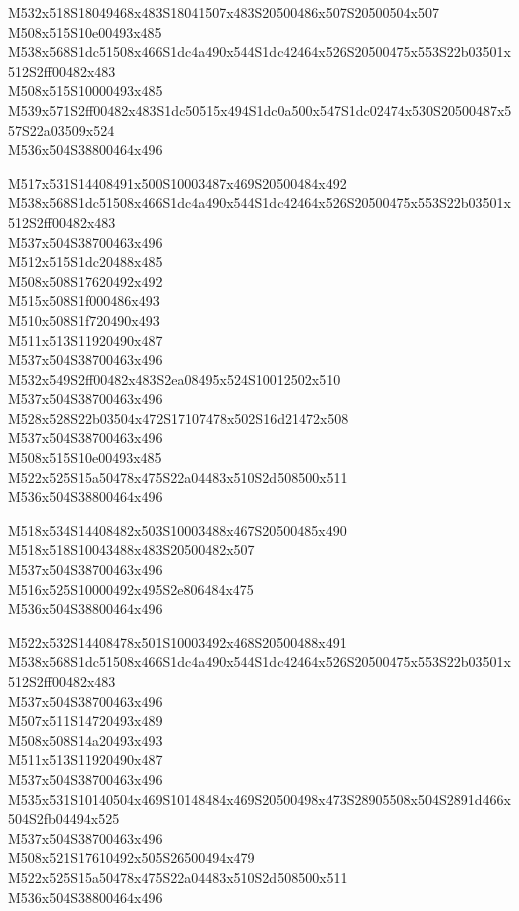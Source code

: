 \documentclass{article}
\begin{document}
\begin{multicols}{5}
\begin{center}
M532x518S18049468x483S18041507x483S20500486x507S20500504x507 %
\\M508x515S10e00493x485 %
\\M538x568S1dc51508x466S1dc4a490x544S1dc42464x526S20500475x553S22b03501x512S2ff00482x483 %
\\M508x515S10000493x485 %
\\M539x571S2ff00482x483S1dc50515x494S1dc0a500x547S1dc02474x530S20500487x557S22a03509x524 %
\\M536x504S38800464x496 %

M517x531S14408491x500S10003487x469S20500484x492 %
\\M538x568S1dc51508x466S1dc4a490x544S1dc42464x526S20500475x553S22b03501x512S2ff00482x483 %
\\M537x504S38700463x496 %
\\M512x515S1dc20488x485 %
\\M508x508S17620492x492 %
\\M515x508S1f000486x493 %
\\M510x508S1f720490x493 %
\\M511x513S11920490x487 %
\\M537x504S38700463x496 %
\\M532x549S2ff00482x483S2ea08495x524S10012502x510 %
\\M537x504S38700463x496 %
\\M528x528S22b03504x472S17107478x502S16d21472x508 %
\\M537x504S38700463x496 %
\\M508x515S10e00493x485 %
\\M522x525S15a50478x475S22a04483x510S2d508500x511 %
\\M536x504S38800464x496 %

M518x534S14408482x503S10003488x467S20500485x490 %
\\M518x518S10043488x483S20500482x507 %
\\M537x504S38700463x496 %
\\M516x525S10000492x495S2e806484x475 %
\\M536x504S38800464x496 %

M522x532S14408478x501S10003492x468S20500488x491 %
\\M538x568S1dc51508x466S1dc4a490x544S1dc42464x526S20500475x553S22b03501x512S2ff00482x483 %
\\M537x504S38700463x496 %
\\M507x511S14720493x489 %
\\M508x508S14a20493x493 %
\\M511x513S11920490x487 %
\\M537x504S38700463x496 %
\\M535x531S10140504x469S10148484x469S20500498x473S28905508x504S2891d466x504S2fb04494x525 %
\\M537x504S38700463x496 %
\\M508x521S17610492x505S26500494x479 %
\\M522x525S15a50478x475S22a04483x510S2d508500x511 %
\\M536x504S38800464x496


\end{center}
\end{multicols}
\end{document}
